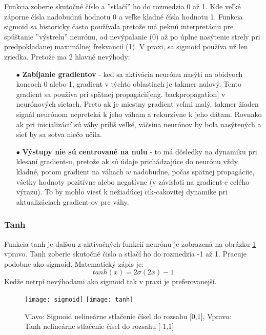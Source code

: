 Funkcia zoberie skutočné číslo a ''stlačí'' ho do rozmedzia 0 až 1.
Kde veľké záporne čísla nadobudnú hodnotu 0 a veľke kladné čísla hodnotu 1.
Funkcia sigmoid sa historicky často používala pretože má peknú interpretáciu pre spúštanie ''výstrelu'' neurónu,
    od nevýpalanie (0) až po úplne nasýtenie strely pri predpokladanej maximálnej frekvancií (1).
V praxi, sa sigmoid používa už len zriedka.
Pretože ma 2 hlavné nevýhody\cite{odkaz:ConvolutionalNeuralNetworkCS231n}:
\begin{enumerate}
    \item[$\bullet$] \textbf{Zabíjanie gradientov} - keď sa aktivácia neurónu nasýti na obidvoch koncoch 0 alebo 1, gradient v týchto oblastiach je takmer nulový.
    Tento gradient sa používa pri spätnej propagácií[eng. backpropagation] v neurónových sietach. Preto ak je miestny gradient veľmi malý, takmer žiaden signál
    neurónom nepreteká k jeho váham a rekurzívne k jeho dátam. Rovnako ak pri inicializácií sú váhy príliš veľké, väčsina neurónov by bola nasýtených a sieť by sa sotva niečo učila.
    \item[$\bullet$] \textbf{Výstupy nie sú centrované na nulu} - to má dôsledky na dynamiku pri klesaní gradient-u, pretože ak sú údaje prichádzajúce do neurónu vždy kladné,
    potom gradient na váhach $w$ nadobudne, počas spätnej propagáciie, všetky hodnoty pozitívne alebo negatívne (v závisloti na gradient-e celého výrazu).
    To by mohlo viesť k nežiadúcej cik-cakovitej dynamike pri aktualizáciach gradient-ov pre váhy.
\end{enumerate}


\subsubsection{Tanh}
Funkcia tanh je dalšou z aktivačných funkcií neurónu je zobrazená na obrázku \ref{pic:ActivationFunctions} vpravo.
Tanh zoberie skutočné čislo a stlačí ho do rozmedzia -1 až 1. Pracuje podobne ako sigmoid.
Matematický zápis je\cite{odkaz:ConvolutionalNeuralNetworkCS231n}:
\begin{equation}
    tanh(x) = 2\sigma(2x) - 1
\end{equation}
Kedže netrpí nevýhodami ako sigmoid tak v praxi je preferovanejší.


\begin{figure}[H]
    \centering
    \texttt{[image: sigmoid]}
    \qquad
    \texttt{[image: tanh]}
    \caption{
        Vľavo: Sigmoid nelineárne stlačenie čísel do rozsahu [0,1],
        Vpravo: Tanh nelineárne stlačenie čísel do rozsahu [-1,1] \cite{odkaz:ConvolutionalNeuralNetworkCS231n}
    }
    \label{pic:ActivationFunctions}
\end{figure}

